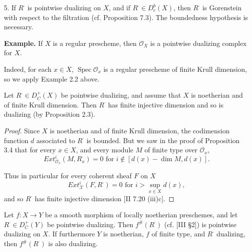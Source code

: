\documentclass[12pt]{book}
\newcommand{\sheaf}[1]{\mathcal{#1}}
\DeclareMathOperator{\Spec}{Spec}
\begin{document}
5. If \(R^{\cdot}\) is pointwise dualizing on \(X\), and if \(R^{\cdot} \in D_{c}^{b}(X)\), then \(R^{\cdot}\) is Gorenstein with respect to the filtration (cf. Proposition 7.3). The boundedness hypothesis is necessary.

\textbf{Example.}
If \(X\) is a regular prescheme, then \(\sheaf{O}_{X}\) is a pointwise dualizing complex for \(X\).

\setcounter{page}{288}
Indeed, for each \(x \in X\),
\(\Spec \sheaf{O}_{x}\) is a regular prescheme of finite Krull dimension, so we apply Example 2.2 above.

\begin{proposition}
Let \(R^{\cdot} \in D_{C}^{+}(X)\) be pointwise dualizing, and assume that \(X\) is noetherian and of finite Krull dimension. Then \(R^{\cdot}\) has finite injective dimension and so is dualizing (by Proposition 2.3).
\end{proposition}

\begin{proof}
Since \(X\) is noetherian and of finite Krull dimension, the codimension function \(d\) associated to \(R^{\cdot}\) is bounded. But we saw in the proof of Proposition 3.4 that for every \(x \in X\), and every module \(M\) of finite type over \(\sheaf{O}_{x}\),
\[Ext_{\sheaf{O}_{x}}^{i}\left(M, R_{x}^{\cdot}\right)=0 \text{ for } i \notin[d(x)-\dim M, d(x)] .\]

Thus in particular for every coherent sheaf \(F\) on \(X\)
\[Ext_{\sheaf{X}}^{i}\left(F, R^{\cdot}\right)=0 \text{ for } i>\sup_{x \in X} d(x),\]
and so \(R^{\cdot}\) has finite injective dimension [II 7.20 (iii)c].
\end{proof}

\begin{theorem}
Let \(f: X \to Y\) be a smooth morphism of locally noetherian preschemes, and let \(R^{\cdot} \in D_{C}^{+}(Y)\) be pointwise dualizing. Then \(f^{\#}(R^{\cdot})\) (cf. [III \S2]) is pointwise dualizing on \(X\).
If furthermore \(Y\) is noetherian, \(f\) of finite type, and \(R^{\cdot}\) dualizing, then \(f^{\#}(R^{\cdot})\) is also dualizing.
\end{theorem}
\end{document}
